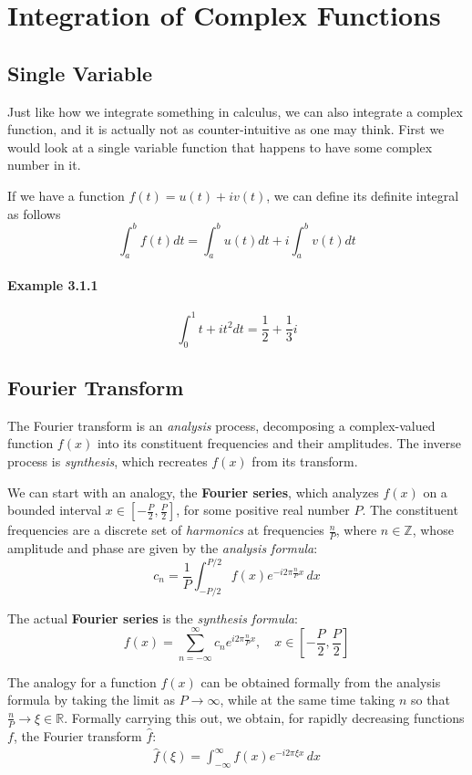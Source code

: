 \documentclass[12pt]{book}
\begin{document}
\chapter{Integration of Complex Functions}
\section{Single Variable}
Just like how we integrate something in calculus, we can also integrate a complex function, and it is actually not as counter-intuitive as one may think. First we would look at a single variable function that happens to have some complex number in it. 

If we have a function $f(t) = u(t) + iv(t)$, we can define its definite integral as follows
\[
\int_{a}^{b} f(t) dt = \int_{a}^{b}u(t)dt + i\int_{a}^{b}v(t) dt
\]
\subsubsection{Example 3.1.1}
\[
\int_{0}^{1}t + it^2 dt = \frac{1}{2} + \frac{1}{3}i
\]
\section{Fourier Transform}
The Fourier transform is an \textit{analysis} process, decomposing a complex-valued function \( f(x) \) into its constituent frequencies and their amplitudes. The inverse process is \textit{synthesis}, which recreates \( f(x) \) from its transform.

We can start with an analogy, the \textbf{Fourier series}, which analyzes \( f(x) \) on a bounded interval \( x \in \left[-\frac{P}{2}, \frac{P}{2}\right] \), for some positive real number \( P \). The constituent frequencies are a discrete set of \textit{harmonics} at frequencies \( \frac{n}{P} \), where \( n \in \mathbb{Z} \), whose amplitude and phase are given by the \textit{analysis formula}:
\[
c_n = \frac{1}{P} \int_{-P/2}^{P/2} f(x) e^{-i 2\pi \frac{n}{P} x} \, dx
\]

The actual \textbf{Fourier series} is the \textit{synthesis formula}:
\[
f(x) = \sum_{n=-\infty}^{\infty} c_n e^{i 2\pi \frac{n}{P} x}, \quad x \in \left[-\frac{P}{2}, \frac{P}{2}\right]
\]

The analogy for a function \( f(x) \) can be obtained formally from the analysis formula by taking the limit as \( P \to \infty \), while at the same time taking \( n \) so that \( \frac{n}{P} \to \xi \in \mathbb{R} \). Formally carrying this out, we obtain, for rapidly decreasing functions \( f \), the Fourier transform \( \hat{f} \):
\begin{align}
  \hat{f}(\xi) = \int_{-\infty}^{\infty} f(x) e^{-i 2\pi \xi x} \, dx  
\end{align}
\end{document}
